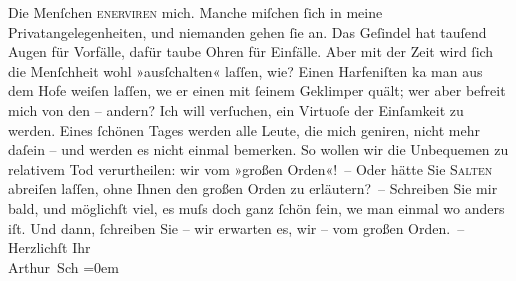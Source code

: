 \begin{ledgroupsized}[t]{13cm}
           \pstart
           Die Menſchen \textsc{enerviren} mich. Manche miſchen ſich in meine
               Privatangelegenheiten, und nie{\pb}manden gehen ſie an.
               Das Geſindel hat tauſend Augen für Vorfälle, dafür taube Ohren für Einfälle. Aber mit
               der Zeit wird ſich die Menſchheit wohl »ausſchalten« laſſen, wie? Einen Harfeniſten
                  ka{\geminationn} man aus dem Hofe weiſen laſſen, we{\geminationn} er einen mit ſeinem Geklimper quält; wer aber befreit
               mich von den – andern? \pend
           \pstart
           Ich will verſuchen, ein Virtuoſe der Einſamkeit zu werden. Eines ſchönen Tages werden
               alle Leute, die mich geniren, {\pb}nicht mehr daſein – und
               werden es nicht einmal bemerken. So wollen wir die Unbequemen zu relativem Tod
               verurtheilen: wir vom »großen Orden«! – Oder hätte Sie \textsc{Salten} abreiſen laſſen, ohne Ihnen den großen Orden zu erläutern? –\pend
           \pstart
           Schreiben Sie mir bald, und möglichſt viel, es muſs doch ganz ſchön ſein, we{\geminationn} man einmal wo anders iſt. Und dann, ſchreiben Sie –
               wir erwarten es, wir – vom großen Orden. –\pend
           \pstart
           {\pb}Herzlichſt Ihr{\\[\baselineskip]}\spacefill\mbox{Arthur Sch}\pend
           \leftskip=0em{}
         
         \endnumbering{}\end{ledgroupsized}  \newcommand{\dateiname}{L00079}\newcommand{\titel}{Arthur Schnitzler an Richard Beer-Hofmann, 11. 3. 1892}\newcommand{\editorInnen}{ Martin Anton Müller und Gerd-Hermann Susen}
      